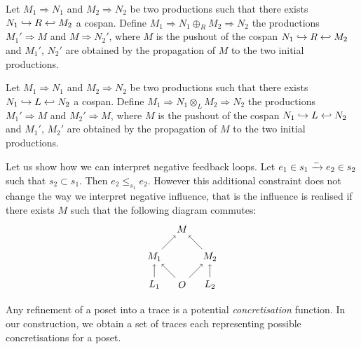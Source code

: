 \begin{definition}
\label{def:seq_comb}
  Let $M_1\Rightarrow N_1$ and $M_2\Rightarrow N_2$ be two productions such that there exists $N_1\hookrightarrow R \hookleftarrow M_2$ a cospan.
  Define $M_1\Rightarrow N_1\oplus_R M_2\Rightarrow N_2$ the productions $M_1'\Rightarrow M$ and $M\Rightarrow N_2'$, where $M$ is the pushout of the cospan $N_1\hookrightarrow R \hookleftarrow M_2$ and $M_1'$, $N_2'$ are obtained by the propagation of $M$ to the two initial productions.
\end{definition}

\begin{definition}
\label{def:conc_comb}
  Let $M_1\Rightarrow N_1$ and $M_2\Rightarrow N_2$ be two productions such that there exists $N_1\hookrightarrow L \hookleftarrow N_2$ a cospan.
  Define $M_1\Rightarrow N_1\otimes_L M_2\Rightarrow N_2$ the productions $M_1'\Rightarrow M$ and $M_2'\Rightarrow M$, where $M$ is the pushout of the cospan $N_1\hookrightarrow L \hookleftarrow N_2$ and $M_1'$, $M_2'$ are obtained by the propagation of $M$ to the two initial productions.
\end{definition}

\begin{example}
Let us show how we can interpret negative feedback loops. Let $e_1\in s_1\mathrel{\xrightarrow{-}} e_2\in s_2$ such that $s_2\subset s_1$. Then $e_2\leq_{s_1} e_2$. However this additional constraint does not change the way we interpret negative influence, that is the influence is realised if there exists $M$ such that the following diagram commutes:
\[
\begin{tikzpicture} %
  \node (o) at (0,0) {\(O\)};
  \node (n) at (0,2) {\(M\)};
  \node (l1) at (-1,0) {\(L_1\)};
  \node (l2) at (1,0) {\(L_2\)};
  \node (n1) at (-1,1) {\(M_1\)};
  \node (n2) at (1,1) {\(M_2\)};
  \draw [->] (l1) -- (n1);
  \draw [->] (l2) -- (n2);
  \draw [->] (o) -- (n1);
  \draw [->] (o) -- (n2);
  \draw [->] (n1) -- (n);
  \draw [->] (n2) -- (n);
\end{tikzpicture}
\]
\end{example}

Any refinement of a poset into a trace is a potential \emph{concretisation} function. In our construction, we obtain a set of traces each representing possible concretisations for a poset.

